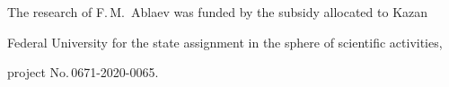 




\vspace*{-24pt}





\Ack





\vspace*{-6pt}





\noindent


The research of F.\,M.~Ablaev was funded by the subsidy allocated to Kazan 


Federal University for the state assignment in the sphere of scientific activities, 


project No.\,0671-2020-0065.
















